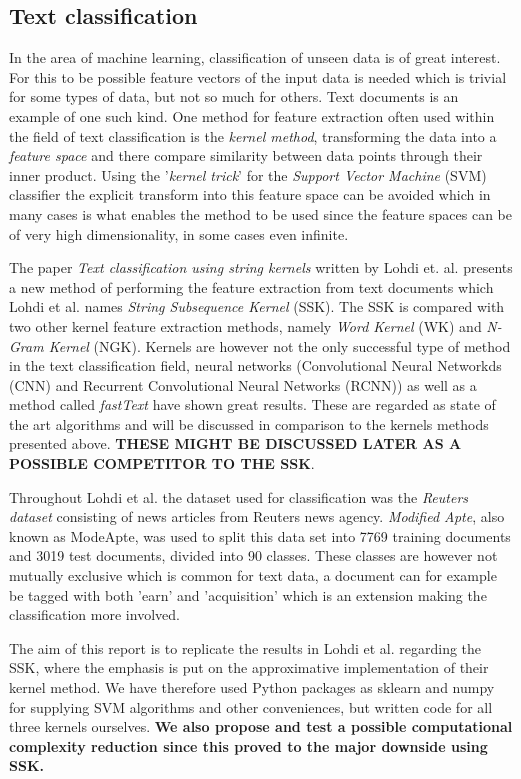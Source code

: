 \subsection{Text classification}
In the area of machine learning, classification of unseen data is of great interest. For this to be possible feature vectors of the input data is needed which is trivial for some types of data, but not so much for others. Text documents is an example of one such kind. One method for feature extraction often used within the field of text classification is the \textit{kernel method}, transforming the data into a \textit{feature space} and there compare similarity between data points through their inner product. Using the '\textit{kernel trick}' for the \textit{Support Vector Machine} (SVM) classifier the explicit transform into this feature space can be avoided which in many cases is what enables the method to be used since the feature spaces can be of very high dimensionality, in some cases even infinite. 

The paper \textit{Text classification using string kernels} written by Lohdi et. al. presents a new method of performing the feature extraction from text documents which Lohdi et al. names \textit{String Subsequence Kernel} (SSK). The SSK is compared with two other kernel feature extraction methods, namely \textit{Word Kernel} (WK) and \textit{N-Gram Kernel} (NGK). Kernels are however not the only successful type of method in the text classification field, neural networks (Convolutional Neural Networkds (CNN) and Recurrent Convolutional Neural Networks (RCNN)) as well as a method called \textit{fastText} have shown great results. These are regarded as state of the art algorithms and will be discussed in comparison to the kernels methods presented above. \textbf{THESE MIGHT BE DISCUSSED LATER AS A POSSIBLE COMPETITOR TO THE SSK}.

Throughout Lohdi et al. the dataset used for classification was the \textit{Reuters dataset} consisting of news articles from Reuters news agency. \textit{Modified Apte}, also known as ModeApte, was used to split this data set into 7769 training documents and 3019 test documents, divided into 90 classes. These classes are however not mutually exclusive which is common for text data, a document can for example be tagged with both 'earn' and 'acquisition' which is an extension making the classification more involved.

The aim of this report is to replicate the results in Lohdi et al. regarding the SSK, where the emphasis is put on the approximative implementation of their kernel method. We have therefore used Python packages as sklearn and numpy for supplying SVM algorithms and other conveniences, but written code for all three kernels ourselves. \textbf{We also propose and test a possible computational complexity reduction since this proved to the major downside using SSK.}
